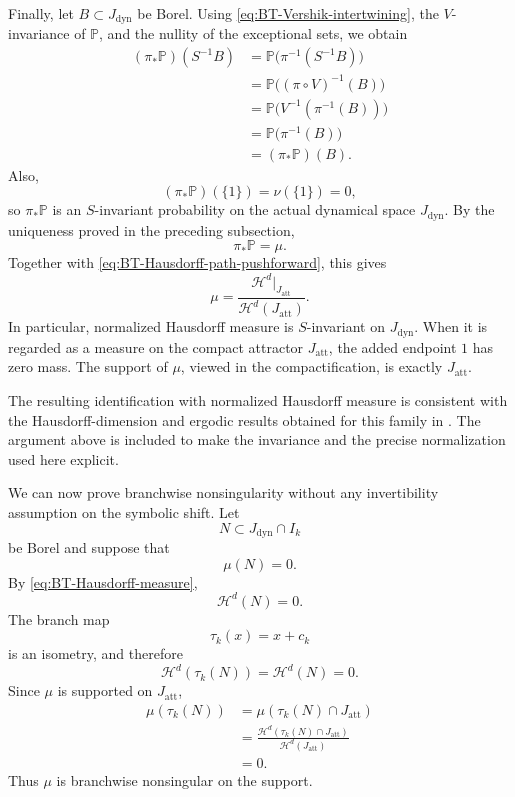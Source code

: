 \documentclass[11pt]{amsart}
\theoremstyle{plain}
\theoremstyle{definition}
\theoremstyle{remark}
\begin{document}
Finally, let \(B\subset J_{\mathrm{dyn}}\) be Borel. Using
\eqref{eq:BT-Vershik-intertwining}, the \(V\)-invariance of
\(\mathbb P\), and the nullity of the exceptional sets, we obtain
\[
\begin{aligned}
(\pi_*\mathbb P)(S^{-1}B)
&=
\mathbb P\bigl(\pi^{-1}(S^{-1}B)\bigr)\\
&=
\mathbb P\bigl((\pi\circ V)^{-1}(B)\bigr)\\
&=
\mathbb P\bigl(V^{-1}(\pi^{-1}(B))\bigr)\\
&=
\mathbb P\bigl(\pi^{-1}(B)\bigr)\\
&=
(\pi_*\mathbb P)(B).
\end{aligned}
\tag{B.13}
\label{eq:BT-path-pushforward-invariance}
\]
Also,
\[
        (\pi_*\mathbb P)(\{1\})
        =
        \nu(\{1\})
        =0,
\]
so \(\pi_*\mathbb P\) is an \(S\)-invariant probability on the actual
dynamical space \(J_{\mathrm{dyn}}\). By the uniqueness proved in the
preceding subsection,
\[
        \pi_*\mathbb P=\mu.
\]
Together with \eqref{eq:BT-Hausdorff-path-pushforward}, this gives
\[
        \boxed{
        \mu
        =
        \frac{\mathcal H^d|_{J_{\mathrm{att}}}}{\mathcal H^d(J_{\mathrm{att}})}.
        }
\tag{B.14}
\label{eq:BT-Hausdorff-measure}
\]
In particular, normalized Hausdorff measure is \(S\)-invariant on
\(J_{\mathrm{dyn}}\). When it is regarded as a measure on the compact
attractor \(J_{\mathrm{att}}\), the added endpoint \(1\) has zero mass. The support of
\(\mu\), viewed in the compactification, is exactly \(J_{\mathrm{att}}\).

The resulting identification with normalized Hausdorff measure is
consistent with the Hausdorff-dimension and ergodic results obtained for
this family in \cite{BruinTroubetzkoy2003}. The argument above is included
to make the invariance and the precise normalization used here explicit.

We can now prove branchwise nonsingularity without any invertibility
assumption on the symbolic shift. Let
\[
        N\subset J_{\mathrm{dyn}}\cap I_k
\]
be Borel and suppose that
\[
        \mu(N)=0.
\]
By \eqref{eq:BT-Hausdorff-measure},
\[
        \mathcal H^d(N)=0.
\]
The branch map
\[
        \tau_k(x)=x+c_k
\]
is an isometry, and therefore
\[
        \mathcal H^d(\tau_k(N))
        =
        \mathcal H^d(N)
        =
        0.
\]
Since \(\mu\) is supported on \(J_{\mathrm{att}}\),
\[
\begin{aligned}
        \mu(\tau_k(N))
        &=
        \mu(\tau_k(N)\cap J_{\mathrm{att}})\\
        &=
        \frac{
        \mathcal H^d(\tau_k(N)\cap J_{\mathrm{att}})
        }{
        \mathcal H^d(J_{\mathrm{att}})
        }\\
        &=0.
\end{aligned}
\]
Thus \(\mu\) is branchwise nonsingular on the support.
\end{document}
